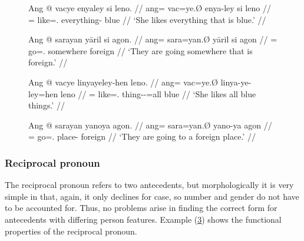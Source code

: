\begin{figure}
\pex\label{ex:indefproadjpc}
\a\begingl
	\gla Ang @ vacye enyaley si leno. //
	\glb ang= vac=ye.Ø enya-ley si leno //
	\glc \AgtT{}= like=\TsgF{}.\Top{} everything-\PargI{} \Rel{} blue //
	\glft `She likes everything that is blue.' //
\endgl

\a\begingl
	\gla Ang @ sarayan yāril si agon. //
	\glb ang= sara=yan.Ø yāril si agon //
	\glc \AgtT{}= go=\TplM{}.\Top{} somewhere \Rel{} foreign //
	\glft `They are going somewhere that is foreign.' //
\endgl
\xe
\end{figure}

\begin{figure}
\pex\label{ex:indefproadjgennoun}
\a\begingl
	\gla Ang @ vacye linyayeley-hen leno. //
	\glb ang= vac=ye.Ø linya-ye-ley=hen leno //
	\glc \AgtT{}= like=\TsgF{}.\Top{} thing-\Pl{}-\PargI{}=all blue //
	\glft `She likes all blue things.' //
\endgl

\a\begingl
	\gla Ang @ sarayan yanoya agon. //
	\glb ang= sara=yan.Ø yano-ya agon //
	\glc \AgtT{}= go=\TplM{}.\Top{} place-\Loc{} foreign //
	\glft `They are going to a foreign place.' //
\endgl
\xe
\end{figure}


\subsubsection{Reciprocal pronoun}

The reciprocal pronoun  refers to two
antecedents, but morphologically it is very simple in that, again, it only
declines for case, so number and gender do not have to be accounted for. Thus,
no problems arise in finding the correct form for antecedents with differing
person features. Example (\ref{ex:recpromorphlex}) shows the functional
properties of the reciprocal pronoun.

\begin{figure}
\begin{morphlex}
\ex\label{ex:recpromorphlex}
\xe
\end{morphlex}
\end{figure}

